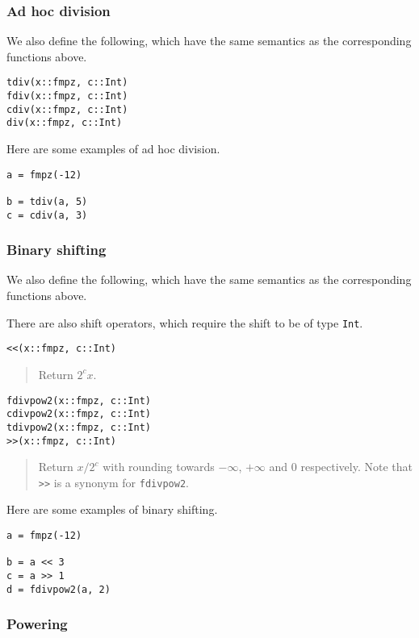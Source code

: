 \documentclass[a4paper,10pt]{article}
\newcommand{\code}{\lstinline}
\newcommand{\desc}[1]{\vspace{-3mm}\begin{quote}#1\end{quote}}
\begin{document}
{{\subsubsection{Ad hoc division}

We also define the following, which have the same semantics as the corresponding functions above.

\begin{lstlisting}
tdiv(x::fmpz, c::Int)
fdiv(x::fmpz, c::Int)
cdiv(x::fmpz, c::Int)
div(x::fmpz, c::Int)
\end{lstlisting}

Here are some examples of ad hoc division.

\begin{lstlisting}
a = fmpz(-12)

b = tdiv(a, 5)
c = cdiv(a, 3)
\end{lstlisting}

\subsubsection{Binary shifting}

We also define the following, which have the same semantics as the corresponding functions above.

There are also shift operators, which require the shift to be of type \code{Int}.

\begin{lstlisting}
<<(x::fmpz, c::Int)
\end{lstlisting}

\desc{Return $2^c x$.}

\begin{lstlisting}
fdivpow2(x::fmpz, c::Int)
cdivpow2(x::fmpz, c::Int)
tdivpow2(x::fmpz, c::Int)
>>(x::fmpz, c::Int)
\end{lstlisting}

\desc{Return $x/2^c$ with rounding towards $-\infty$, $+\infty$ and $0$ respectively. 
Note that \code{>>} is a synonym for \code{fdivpow2}.}

Here are some examples of binary shifting.

\begin{lstlisting}
a = fmpz(-12)

b = a << 3
c = a >> 1
d = fdivpow2(a, 2)
\end{lstlisting}

\subsubsection{Powering}

}}
\end{document}
